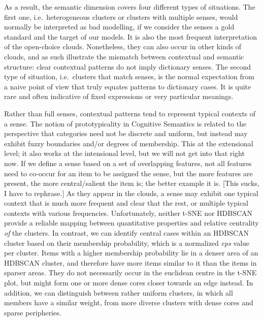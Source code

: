 \documentclass[
]{book}
\begin{document}
As a result, the semantic dimension covers four different types of situations. The first one, i.e.~heterogeneous clusters or clusters with multiple senses, would normally be interpreted as bad modelling, if we consider the senses a gold standard and the target of our models. It is also the most frequent interpretation of the open-choice clouds. Nonetheless, they can also occur in other kinds of clouds, and as such illustrate the mismatch between contextual and semantic structure: clear contextual patterns do not imply dictionary senses. The second type of situation, i.e.~clusters that match senses, is the normal expectation from a naive point of view that truly equates patterns to dictionary cases. It is quite rare and often indicative of fixed expressions or very particular meanings.

Rather than full senses, contextual patterns tend to represent typical contexts of a sense.
The notion of prototypicality in Cognitive Semantics is related to the perspective that categories need not be discrete and uniform, but instead may exhibit fuzzy boundaries and/or degrees of membership. This at the extensional level; it also works at the intensional level, but we will not get into that right now. If we define a sense based on a set of overlapping features, not all features need to co-occur for an item to be assigned the sense, but the more features are present, the more central/salient the item is; the better example it is. {[}This sucks, I have to rephrase.{]}
As they appear in the clouds, a sense may exhibit one typical context that is much more frequent and clear that the rest, or multiple typical contexts with various frequencies. Unfortunately, neither t-SNE nor HDBSCAN provide a reliable mapping between quantitative properties and relative centrality \emph{of} the clusters. In contrast, we can identify central cases within an HDBSCAN cluster based on their membership probability, which is a normalized \emph{eps} value per cluster. Items with a higher membership probability lie in a denser area of an HDBSCAN cluster, and therefore have more items similar to it than the items in sparser areas. They do not necessarily occur in the euclidean centre in the t-SNE plot, but might form one or more dense cores closer towards an edge instead. In addition, we can distinguish between rather uniform clusters, in which all members have a similar weight, from more diverse clusters with dense cores and sparse peripheries.
\end{document}

